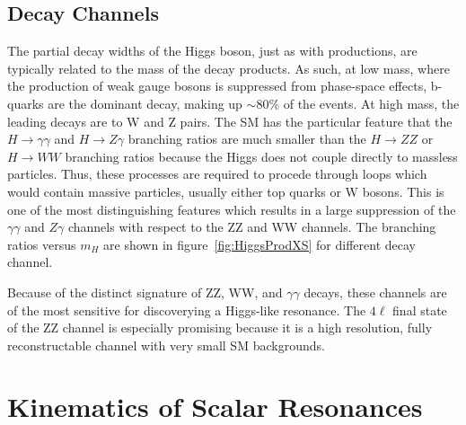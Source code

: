 \subsection{Decay Channels}
\label{sec:HiggsDecays}

The partial decay widths of the Higgs boson, just as with productions, are typically related to the mass of the decay products.  As such, at low 
mass, where the production of weak gauge bosons is suppressed from 
phase-space effects, b-quarks are the dominant decay, making up $\sim80\%$ of 
the events.  At high mass, the leading decays are to W and Z pairs.  
The SM has the particular feature that the $H\to\gamma\gamma$ and 
$H\to Z\gamma$ branching ratios are much smaller than the $H\to ZZ$ or 
$H\to WW$ branching ratios
because the Higgs does not couple directly to massless particles.  Thus, these
processes are required to procede through loops which would contain massive
particles, usually either top quarks or W bosons.  This is one of the 
most distinguishing features which results in a large suppression of 
the $\gamma\gamma$ and $Z\gamma$ channels with respect to the ZZ and WW
channels.  The branching ratios versus $m_H$ are shown in 
figure~\ref{fig:HiggsProdXS} for different decay channel. 

Because of the distinct signature of ZZ,
WW, and $\gamma\gamma$ decays, these channels are of the most sensitive for 
discoverying a Higgs-like resonance.  The $4\ell$ final state of the ZZ 
channel is especially promising because it is a high resolution, fully 
reconstructable channel with very small SM backgrounds.


\section{Kinematics of Scalar Resonances}
\label{sec:Kinematics of scalar resonances}

